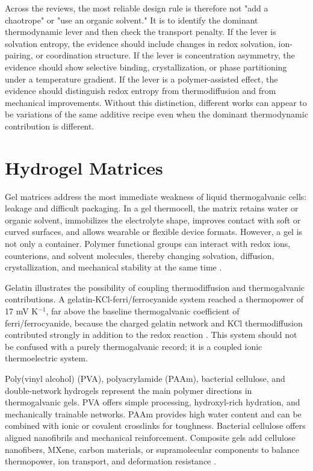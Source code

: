 \documentclass[a4paper,12pt]{report}
\begin{document}
Across the reviews, the most reliable design rule is therefore not "add a
chaotrope" or "use an organic solvent." It is to identify the dominant
thermodynamic lever and then check the transport penalty. If the lever is
solvation entropy, the evidence should include changes in redox solvation,
ion-pairing, or coordination structure. If the lever is concentration
asymmetry, the evidence should show selective binding, crystallization, or
phase partitioning under a temperature gradient. If the lever is a
polymer-assisted effect, the evidence should distinguish redox entropy from
thermodiffusion and from mechanical improvements. Without this distinction,
different works can appear to be variations of the same additive recipe even
when the dominant thermodynamic contribution is different.

\section{Hydrogel Matrices}

Gel matrices address the most immediate weakness of liquid thermogalvanic
cells: leakage and difficult packaging. In a gel thermocell, the matrix retains
water or organic solvent, immobilizes the electrolyte shape, improves contact
with soft or curved surfaces, and allows wearable or flexible device formats.
However, a gel is not only a container. Polymer functional groups can interact
with redox ions, counterions, and solvent molecules, thereby changing
solvation, diffusion, crystallization, and mechanical stability at the same
time \citep{lin2024triple,lu2024zwitterion,yin2023bacterial}.

Gelatin illustrates the possibility of coupling thermodiffusion and
thermogalvanic contributions. A gelatin-KCl-ferri/ferrocyanide system reached
a thermopower of 17 mV K$^{-1}$, far above the baseline thermogalvanic
coefficient of ferri/ferrocyanide, because the charged gelatin network and KCl
thermodiffusion contributed strongly in addition to the redox reaction
\citep{han2020gelatin}. This system should not be confused
with a purely thermogalvanic record; it is a coupled ionic thermoelectric
system.

Poly(vinyl alcohol) (PVA), polyacrylamide (PAAm), bacterial cellulose, and
double-network hydrogels represent the main polymer directions in
thermogalvanic gels. PVA offers simple processing, hydroxyl-rich hydration, and
mechanically trainable networks. PAAm provides high water content and can be
combined with ionic or covalent crosslinks for toughness. Bacterial cellulose
offers aligned nanofibrils and mechanical reinforcement. Composite gels add
cellulose nanofibers, MXene, carbon materials, or supramolecular components to
balance thermopower, ion transport, and deformation resistance
\citep{zhou2020hydrogel,yang2023strong,liu2024armor,lin2024triple}.
\end{document}
